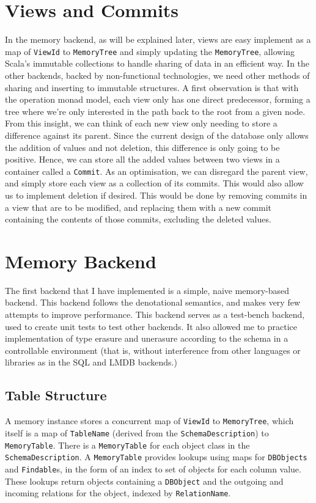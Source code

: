 \documentclass[12pt,a4paper,twoside,openright]{report}
\newcommand\codeName[1]{\texttt{#1}}
\begin{document}
\section{Views and Commits}
In the memory backend, as will be explained later, views are easy implement as a map of \codeName{ViewId} to \codeName{MemoryTree} and simply updating the \codeName{MemoryTree}, allowing Scala's immutable collections to handle sharing of data in an efficient way. In the other backends, backed by non-functional technologies, we need other methods of sharing and inserting to immutable structures. A first observation is that with the operation monad model, each view only has one direct predecessor, forming a tree where we're only interested in the path back to the root from a given node. From this insight, we can think of each new view only needing to store a difference against its parent. Since the current design of the database only allows the addition of values and not deletion, this difference is only going to be positive. Hence, we can store all the added values between two views in a container called a \codeName{Commit}. As an optimisation, we can disregard the parent view, and simply store each view as a collection of its commits. This would also allow us to implement deletion if desired. This would be done by removing commits in a view that are to be modified, and replacing them with a new commit containing the contents of those commits, excluding the deleted values.

\section{Memory Backend}
The first backend that I have implemented is a simple, naive memory-based backend. This backend follows the denotational semantics, and makes very few attempts to improve performance. This backend serves as a test-bench backend, used to create unit tests to test other backends. It also allowed me to practice implementation of type erasure and unerasure according to the schema in a controllable environment (that is, without interference from other languages or libraries as in the SQL and LMDB backends.)
	\subsection{Table Structure}
	A memory instance stores a concurrent map of \codeName{ViewId} to \codeName{MemoryTree}, which itself is a map of \codeName{TableName} (derived from the \codeName{SchemaDescription}) to \codeName{MemoryTable}. There is a \codeName{MemoryTable} for each object class in the \codeName{SchemaDescription}. A \codeName{MemoryTable} provides lookups using maps for \codeName{DBObjects} and \codeName{Findable}s, in the form of an index to set of objects for each column value. These lookups return objects containing a \codeName{DBObject} and the outgoing and incoming relations for the object, indexed by \codeName{RelationName}. 
\end{document}
